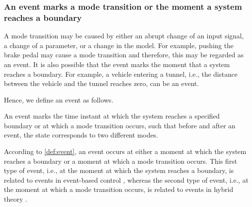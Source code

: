 \subsubsection{An event marks a mode transition or the moment a system reaches a boundary}
A mode transition may be caused by either an abrupt change of an input signal, a change of a parameter, or a change in the model. For example, pushing the brake pedal may cause a mode transition and therefore, this may be regarded as an event. It is also possible that the event marks the moment that a system reaches a boundary. For example, a vehicle entering a tunnel, i.e., the distance between the vehicle and the tunnel reaches zero, can be an event.


Hence, we define an event as follows.
\begin{definition}[Event] \label{def:event}
	An event marks the time instant at which the system reaches a specified boundary or at which a mode transition occurs, such that before and after an event, the state corresponds to two different modes.
\end{definition}

According to \cref{def:event}, an event occurs at either a moment at which the system reaches a boundary or a moment at which a mode transition occurs. This first type of event, i.e., at the moment at which the system reaches a boundary, is related to events in event-based control \cite{heemels2012eventcontrol}, whereas the second type of event, i.e., at the moment at which a mode transition occurs, is related to events in hybrid theory \cite{deschutter2000optimal}. 


